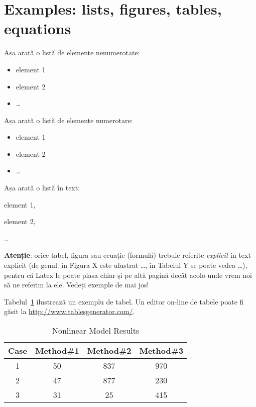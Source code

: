 \section{Examples: lists, figures, tables, equations}

Așa arată o listă de elemente nenumerotate:
\begin{itemize}
  \item element 1
  \item element 2
  \item \dots
\end{itemize}


Așa arată o listă de elemente numerotare:
\begin{itemize}
  \item element 1
  \item element 2
  \item \dots
\end{itemize}


Așa arată o listă în text: 
\begin{inparaenum}[(\itshape 1 \upshape)]
  \item element 1, 
  \item element 2, 
  \item \dots
\end{inparaenum}

\textbf{Atenție}: orice tabel, figura sau ecuație (formulă) trebuie referite \textit{explicit} în text explicit (de genul: în Figura X este ulustrat \dots, în Tabelul Y se poate vedea \dots), pentru că Latex le poate plasa chiar și pe altă pagină decât acolo unde vrem noi să ne referim la ele. Vedeți exemple de mai jos!

Tabelul~\ref{table:example} ilustrează un exemplu de tabel. Un editor on-line de tabele poate fi găsit la \url{http://www.tablesgenerator.com/}. 

\begin{table}[t]
\centering                          %
\begin{tabular}{|c|c|c|c|}          %
\hline\hline                        %
Case & Method\#1 & Method\#2 & Method\#3 \\ [0.5ex]   %
\hline                              %
1 & 50 & 837 & 970 \\               %
2 & 47 & 877 & 230 \\
3 & 31 & 25 & 415 \\[1ex]           %
\hline                              
\end{tabular}
\caption{Nonlinear Model Results}   %
\label{table:example}                %
\end{table}


